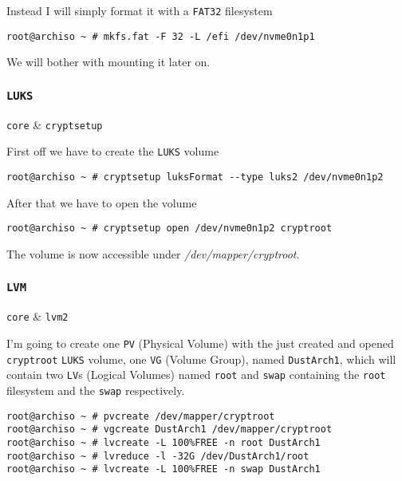 \documentclass[10pt]{dustdoc}
\begin{document}
Instead I will simply format it with a \texttt{FAT32} filesystem

\begin{verbatim}
root@archiso ~ # mkfs.fat -F 32 -L /efi /dev/nvme0n1p1
\end{verbatim}

We will bother with mounting it later on.

\subsubsection{\texttt{LUKS}}
\label{sec:luks}

\begin{packagetable}
    \texttt{core} & \texttt{cryptsetup} \\ 
\end{packagetable}

First off we have to create the \texttt{LUKS} volume

\begin{verbatim}
root@archiso ~ # cryptsetup luksFormat --type luks2 /dev/nvme0n1p2
\end{verbatim}

After that we have to open the volume

\begin{verbatim}
root@archiso ~ # cryptsetup open /dev/nvme0n1p2 cryptroot
\end{verbatim}

The volume is now accessible under \textit{/dev/mapper/cryptroot}.

\subsubsection{\texttt{LVM}}
\label{sec:lvm}

\begin{packagetable}
    \texttt{core} & \texttt{lvm2} \\ 
\end{packagetable}

I’m going to create one \texttt{PV} (Physical Volume) with the just created and opened \texttt{cryptroot} \texttt{LUKS} volume, one \texttt{VG} (Volume Group), named \texttt{DustArch1}, which will contain two \texttt{LV}s (Logical Volumes) named \texttt{root} and \texttt{swap} containing the \texttt{root} filesystem and the \texttt{swap} respectively.

\begin{verbatim}
root@archiso ~ # pvcreate /dev/mapper/cryptroot
root@archiso ~ # vgcreate DustArch1 /dev/mapper/cryptroot
root@archiso ~ # lvcreate -L 100%FREE -n root DustArch1
root@archiso ~ # lvreduce -l -32G /dev/DustArch1/root
root@archiso ~ # lvcreate -L 100%FREE -n swap DustArch1
\end{verbatim}
\end{document}

